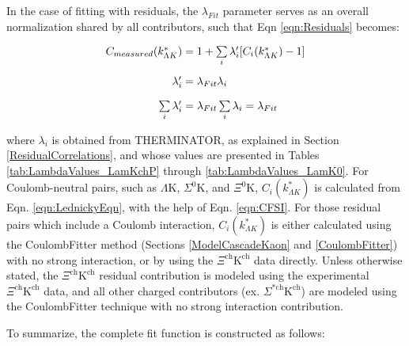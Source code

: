 \documentclass[../AnalysisNoteJBuxton.tex]{subfiles}
\begin{document}
In the case of fitting with residuals, the $\lambda_{Fit}$ parameter serves as an overall normalization shared by all contributors, such that Eqn \ref{eqn:Residuals} becomes:

\begin{equation}
\begin{array}{r@{}l}
    C_{measured}(k^{*}_{\Lambda K}) &{}= 1 + \sum\limits_{i}\lambda_{i}'[C_{i}(k^{*}_{\Lambda K})-1]\\[15pt]
    \lambda_{i}' &{}= \lambda_{Fit}\lambda_{i} \\[10pt]
    \sum\limits_{i}\lambda_{i}' &{}=  \lambda_{Fit}\sum\limits_{i}\lambda_{i} = \lambda_{Fit}
\end{array}
\label{eqn:ResidualsvLambdaNorm}
\end{equation}

where $\lambda_{i}$ is obtained from THERMINATOR, as explained in Section \ref{ResidualCorrelations}, and whose values are presented in Tables \ref{tab:LambdaValues_LamKchP} through \ref{tab:LambdaValues_LamK0}.  For Coulomb-neutral pairs, such as $\Lambda$K, $\Sigma^{0}$K, and $\Xi^{0}$K, $C_{i}(k^{*}_{\Lambda K})$ is calculated from Eqn. \ref{eqn:LednickyEqn}, with the help of Eqn. \ref{eqn:CFSI}.  For those residual pairs which include a Coulomb interaction, $C_{i}(k^{*}_{\Lambda K})$ is either calculated using the CoulombFitter method (Sections \ref{ModelCascadeKaon} and \ref{CoulombFitter}) with no strong interaction, or by using the $\Xi^{\mathrm{ch}}\mathrm{K^{ch}}$ data directly.  Unless otherwise stated, the $\Xi^{\mathrm{ch}}\mathrm{K^{ch}}$ residual contribution is modeled using the experimental $\Xi^{\mathrm{ch}}\mathrm{K^{ch}}$ data, and all other charged contributors (ex. $\Sigma^{*\mathrm{ch}}\mathrm{K^{ch}}$) are modeled using the CoulombFitter technique with no strong interaction contribution.

To summarize, the complete fit function is constructed as follows:
\end{document}
